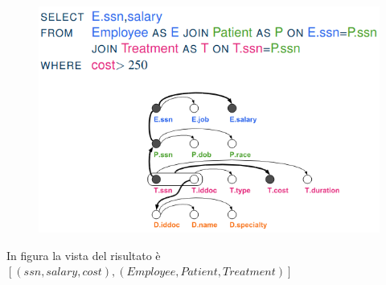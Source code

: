 \documentclass{report}
\begin{document}
\begin{figure}[H]
    \centering
    \includegraphics[width=1\linewidth]{images/view-graph2.png}
\end{figure}

\noindent In figura la vista del risultato è $[(ssn, salary, cost), (Employee, Patient, Treatment)]$
\end{document}
